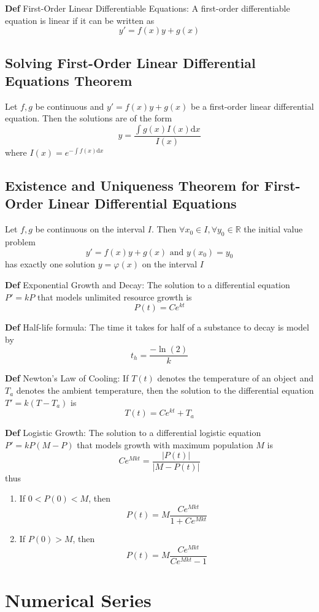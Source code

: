 \documentclass[11pt,notitlepage]{report}
\begin{document}
\textbf{Def} First-Order Linear Differentiable Equations: A first-order differentiable equation is linear if it can be written as
$$y' = f(x)y + g(x)$$

\section{Solving First-Order Linear Differential Equations Theorem}Let $f, g$ be continuous and $y' = f(x)y+g(x)$ be a first-order linear differential equation. Then the solutions are of the form
$$y = \frac{\int g(x)I(x) \mathrm{d}x}{I(x)}$$
where $I(x) = e^{-\int f(x) \mathrm{d}x}$


\section{Existence and Uniqueness Theorem for First-Order Linear Differential Equations}Let $f, g$ be continuous on the interval $I$. Then $\forall x_0 \in I, \forall y_0 \in \mathbb R$ the initial value problem
$$y' = f(x)y+g(x) \text{ and } y(x_0) = y_0$$
has exactly one solution $y = \varphi(x)$ on the interval $I$

\textbf{Def} Exponential Growth and Decay: The solution to a differential equation $P' = kP$ that models unlimited resource growth is
$$P(t) = Ce^{kt}$$

\textbf{Def} Half-life formula: The time it takes for half of a substance to decay is model by
$$t_h = \frac{-\ln{(2)}}{k}$$

\textbf{Def} Newton's Law of Cooling: If $T(t)$ denotes the temperature of an object and $T_a$ denotes the ambient temperature, then the solution to the differential equation $T' = k(T-T_a)$ is
$$T(t) = Ce^{kt} + T_a$$

\textbf{Def} Logistic Growth: The solution to a differential logistic equation $P' = kP(M-P)$ that models growth with maximum population $M$ is
$$Ce^{Mkt} = \frac{|P(t)|}{|M - P(t)|}$$ thus
\begin{enumerate}
    \item If $0 < P(0) < M$, then $$P(t) = M\frac{Ce^{Mkt}}{1+Ce^{Mkt}}$$
    \item If $P(0) > M$, then $$P(t) = M\frac{Ce^{Mkt}}{Ce^{Mkt}-1}$$
\end{enumerate}


\chapter{Numerical Series}
\end{document}
